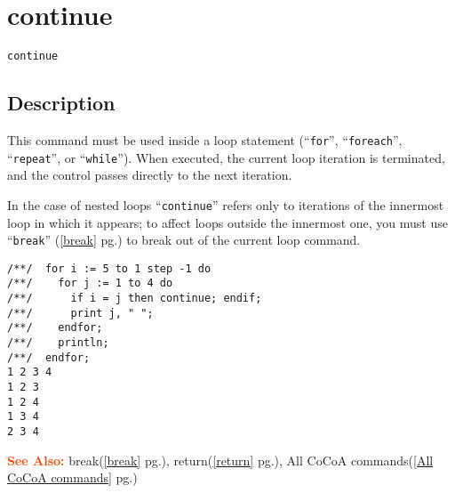 \documentclass[a4paper]{mybook}
\newenvironment{command}{}{} %
\newcommand\SeeAlso{\par\textcolor{OrangeRed}{\textbf{\large See Also: }}}
\begin{document}
\section{continue}
\label{continue}
\begin{command} %


\begin{Verbatim}[label=syntax, rulecolor=\color{MidnightBlue},
frame=single]
continue
\end{Verbatim}


\subsection*{Description}

This command must be used inside a loop statement (``\verb&for&'', ``\verb&foreach&'',
``\verb&repeat&'', or ``\verb&while&'').
When executed, the current loop iteration is terminated, and the control
passes directly to the next iteration.
\par 
In the case of nested loops ``\verb&continue&'' refers only to iterations of
the innermost loop in which it appears; to affect loops outside the
innermost one, you must use ``\verb&break&'' (\ref{break} pg.\pageref{break}) to break out of the
current loop command.
\begin{Verbatim}[label=example, rulecolor=\color{PineGreen}, frame=single]
/**/  for i := 5 to 1 step -1 do
/**/    for j := 1 to 4 do
/**/      if i = j then continue; endif;
/**/      print j, " ";
/**/    endfor;
/**/    println;
/**/  endfor;
1 2 3 4 
1 2 3 
1 2 4 
1 3 4 
2 3 4 
\end{Verbatim}


\SeeAlso %
  break(\ref{break} pg.\pageref{break}), 
    return(\ref{return} pg.\pageref{return}), 
    All CoCoA commands(\ref{All CoCoA commands} pg.\pageref{All CoCoA commands})
\end{command} %
\end{document}
